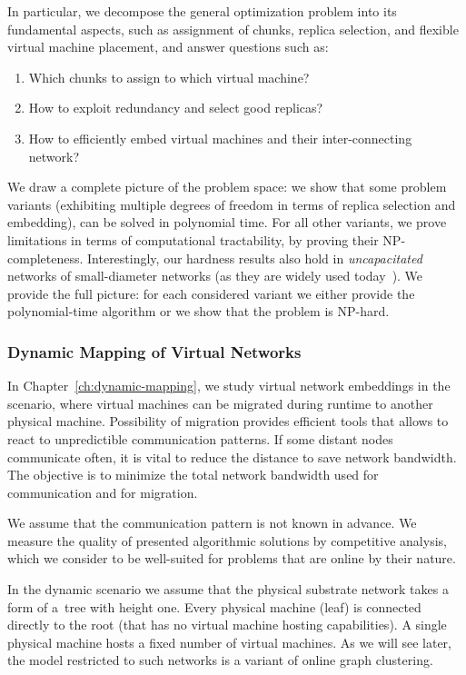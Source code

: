 In particular, we decompose the general optimization problem into its fundamental aspects, such as
assignment of chunks, replica selection, and flexible virtual machine
placement, and answer questions such as:
\begin{enumerate}
\item Which chunks to assign to which virtual machine?

\item How to exploit redundancy and select good replicas?

\item How to efficiently embed virtual machines and their inter-connecting network?

\end{enumerate}

We draw a complete picture of the problem space: we show that
some problem variants (exhibiting multiple degrees of freedom in terms of
replica selection and embedding),
can be solved in polynomial time. For all other variants, we prove limitations in terms of
computational tractability, by proving their NP-completeness. Interestingly,
our hardness results also hold in \emph{uncapacitated}
networks of small-diameter networks (as they are
widely used today~\cite{fattree}).
We provide the full picture: for each considered variant we either provide the polynomial-time algorithm or we show that the problem is NP-hard.


\subsubsection{Dynamic Mapping of Virtual Networks}
\label{sec:contributions-dynamic-mapping}

In Chapter~\ref{ch:dynamic-mapping}, we study virtual network embeddings in the scenario, where virtual machines can be migrated during runtime to another physical machine.
Possibility of migration provides efficient tools that allows to react to unpredictible communication patterns.
If some distant nodes communicate often, it is vital to reduce the distance to save network bandwidth.
The objective is to minimize the total network bandwidth used for communication and for migration.

We assume that the communication pattern is not known in advance.
We measure the quality of presented algorithmic solutions by competitive analysis, which we consider to be well-suited for problems that are online by their nature.

In the dynamic scenario we assume that the physical substrate network takes a form of a~tree with height one.
Every physical machine (leaf) is connected directly to the root (that has no virtual machine hosting capabilities).
A single physical machine hosts a fixed number of virtual machines.
As we will see later, the model restricted to such networks is a variant of online graph clustering.


